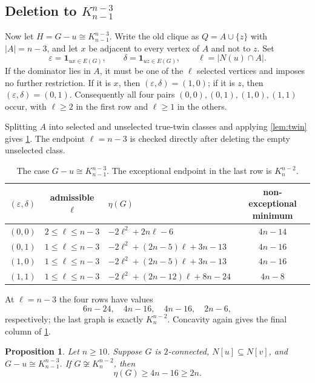 \documentclass[11pt,reqno]{amsart}
\newtheorem{proposition}[proposition]{Proposition}
\theoremstyle{definition}
\theoremstyle{remark}
\begin{document}
\subsection{Deletion to \texorpdfstring{$K_{n-1}^{n-3}$}{K(n-1,n-3)}}

Now let $H=G-u\cong K_{n-1}^{n-3}$.  Write the old clique as
$Q=A\cup\{z\}$ with $|A|=n-3$, and let $x$ be adjacent to every vertex of
$A$ and not to $z$.  Set
\[
 \varepsilon=\mathbf 1_{ux\in E(G)},\qquad
 \delta=\mathbf 1_{uz\in E(G)},\qquad
 \ell=|N(u)\cap A|.
\]
If the dominator lies in $A$, it must be one of the $\ell$ selected vertices
and imposes no further restriction.  If it is $x$, then
$(\varepsilon,\delta)=(1,0)$; if it is $z$, then
$(\varepsilon,\delta)=(0,1)$.  Consequently all four pairs
$(0,0),(0,1),(1,0),(1,1)$ occur, with $\ell\ge2$ in the first row and
$\ell\ge1$ in the others.

Splitting $A$ into selected and unselected true-twin classes and applying
\cref{lem:twin} gives \cref{tab:kn3}.  The endpoint $\ell=n-3$ is checked
directly after deleting the empty unselected class.

\begin{table}[H]
\centering
\caption{The case $G-u\cong K_{n-1}^{n-3}$.  The exceptional endpoint in the
last row is $K_n^{n-2}$.}\label{tab:kn3}
\small
\begin{tabular}{@{}c c l c@{}}
\toprule
$(\varepsilon,\delta)$ & admissible $\ell$ & $\eta(G)$ & non-exceptional minimum \\
\midrule
$(0,0)$ & $2\le\ell\le n-3$
& $-2\ell^2+2n\ell-6$ & $4n-14$ \\
$(0,1)$ & $1\le\ell\le n-3$
& $-2\ell^2+(2n-5)\ell+3n-13$ & $4n-16$ \\
$(1,0)$ & $1\le\ell\le n-3$
& $-2\ell^2+(2n-5)\ell+3n-13$ & $4n-16$ \\
$(1,1)$ & $1\le\ell\le n-3$
& $-2\ell^2+(2n-12)\ell+8n-24$ & $4n-8$ \\
\bottomrule
\end{tabular}
\end{table}

At $\ell=n-3$ the four rows have values
\[
 6n-24,\quad 4n-16,\quad 4n-16,\quad 2n-6,
\]
respectively; the last graph is exactly $K_n^{n-2}$.  Concavity again gives
the final column of \cref{tab:kn3}.

\begin{proposition}\label{prop:kn3extension}
Let $n\ge10$.  Suppose $G$ is $2$-connected, $N[u]\subseteq N[v]$, and
$G-u\cong K_{n-1}^{n-3}$.  If $G\not\cong K_n^{n-2}$, then
\[
  \eta(G)\ge 4n-16\ge2n.
\]
\end{proposition}
\end{document}
